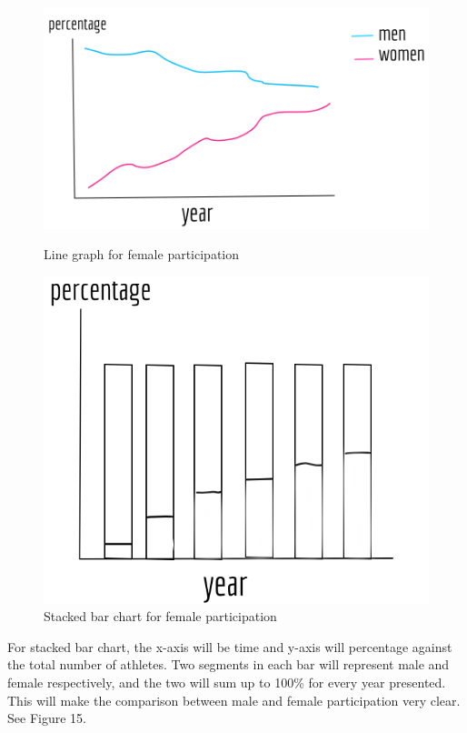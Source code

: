 \documentclass[12pt]{article}
\begin{document}
\begin{figure}[!t]
  \begin{minipage}[b]{0.45\textwidth}
  \centering
    \includegraphics[scale=0.29]{pics/1.png}
    \caption{\footnotesize Line graph for female participation}
    \label{fig:1}
  \end{minipage}
  \hfill
  \begin{minipage}[b]{0.45\textwidth}
  \centering
    \includegraphics[scale=0.3]{pics/2.png}
    \caption{\footnotesize Stacked bar chart for female participation}
    \label{fig:2}
  \end{minipage}
\end{figure}

For stacked bar chart, the x-axis will be time and y-axis will percentage against the total number of athletes. Two segments in each bar will represent male and female respectively, and the two will sum up to 100\% for every year presented. This will make the comparison between male and female participation very clear. See Figure 15.
\end{document}
